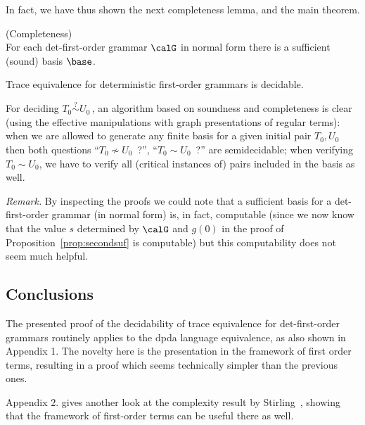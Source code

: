 \documentclass[12pt]{article}
\begin{document}
\noindent
In fact, we have thus shown the next completeness
lemma, and the main theorem.

\begin{lemma}\label{lem:completeness1} (Completeness)
\\
For each det-first-order grammar $\calG$ in normal form
there is a sufficient (sound) basis $\base$.
\end{lemma}





\begin{theorem}\label{th:tracedecid}
Trace
equivalence for deterministic
first-order grammars 
is decidable. 
\end{theorem}
For deciding $T_0\stackrel{?}{\sim} U_0$\,, 
an algorithm based on soundness and completeness is clear
(using the effective manipulations with graph 
presentations of regular terms): when we
are allowed to generate any finite basis for a given initial pair
$T_0,U_0$ then both questions ``$T_0\not\sim U_0$~?'', 
``$T_0\sim U_0$~?'' are semidecidable; when verifying $T_0\sim U_0$,
we have to verify all (critical instances of) pairs included in the basis as well.

\emph{Remark.} By inspecting the proofs we could note that a sufficient
basis for a det-first-order grammar (in normal form) is, in fact,
computable (since we now know that
the value $s$ determined by $\calG$ and $g(0)$ in
the proof of Proposition~\ref{prop:secondsuf} is computable) 
but this
computability does not seem much helpful.


\subsection*{Conclusions}


The presented proof of the decidability of trace equivalence for
det-first-order grammars routinely applies 
to the dpda language equivalence, as also shown in Appendix 1. 
The novelty here is the presentation in the framework of first order terms,
resulting in a proof which seems technically simpler than the previous
ones. 


Appendix 2. gives another look at the complexity result by 
Stirling~\cite{Stir:DPDA:prim}, showing that the
framework of first-order terms can be useful there as well.  
\end{document}
